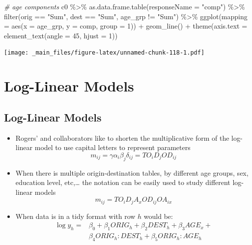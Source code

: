 \documentclass[
]{book}
\newenvironment{Shaded}{\begin{snugshade}}{\end{snugshade}}
\newcommand{\AttributeTok}[1]{\textcolor[rgb]{0.77,0.63,0.00}{#1}}
\newcommand{\CommentTok}[1]{\textcolor[rgb]{0.56,0.35,0.01}{\textit{#1}}}
\newcommand{\DecValTok}[1]{\textcolor[rgb]{0.00,0.00,0.81}{#1}}
\newcommand{\FunctionTok}[1]{\textcolor[rgb]{0.00,0.00,0.00}{#1}}
\newcommand{\NormalTok}[1]{#1}
\newcommand{\SpecialCharTok}[1]{\textcolor[rgb]{0.00,0.00,0.00}{#1}}
\newcommand{\StringTok}[1]{\textcolor[rgb]{0.31,0.60,0.02}{#1}}
\providecommand{\tightlist}{%
  \setlength{\itemsep}{0pt}\setlength{\parskip}{0pt}}
\begin{document}
\begin{Shaded}
\begin{Highlighting}[]
\CommentTok{\# age components}
\NormalTok{c0 }\SpecialCharTok{\%\textgreater{}\%}
  \FunctionTok{as.data.frame.table}\NormalTok{(}\AttributeTok{responseName =} \StringTok{"comp"}\NormalTok{) }\SpecialCharTok{\%\textgreater{}\%}
  \FunctionTok{filter}\NormalTok{(orig }\SpecialCharTok{==} \StringTok{"Sum"}\NormalTok{, dest }\SpecialCharTok{==} \StringTok{"Sum"}\NormalTok{, age\_grp }\SpecialCharTok{!=} \StringTok{"Sum"}\NormalTok{) }\SpecialCharTok{\%\textgreater{}\%}
  \FunctionTok{ggplot}\NormalTok{(}\AttributeTok{mapping =} \FunctionTok{aes}\NormalTok{(}\AttributeTok{x =}\NormalTok{ age\_grp, }\AttributeTok{y =}\NormalTok{ comp, }\AttributeTok{group =} \DecValTok{1}\NormalTok{)) }\SpecialCharTok{+}
  \FunctionTok{geom\_line}\NormalTok{() }\SpecialCharTok{+}
  \FunctionTok{theme}\NormalTok{(}\AttributeTok{axis.text =} \FunctionTok{element\_text}\NormalTok{(}\AttributeTok{angle =} \DecValTok{45}\NormalTok{, }\AttributeTok{hjust =} \DecValTok{1}\NormalTok{))}
\end{Highlighting}
\end{Shaded}

\texttt{[image: \_main\_files/figure-latex/unnamed-chunk-118-1.pdf]}

\hypertarget{log-linear-models}{%
\section{Log-Linear Models}\label{log-linear-models}}

\hypertarget{log-linear-models-1}{%
\subsection{Log-Linear Models}\label{log-linear-models-1}}

\begin{itemize}
\tightlist
\item
  Rogers' and collaborators like to shorten the multiplicative form of the log-linear model to use capital letters to represent parameters
  \[
  m_{ij} = \gamma \alpha_i \beta_j \delta_{ij} = T O_i D_j OD_{ij}
  \]
\item
  When there is multiple origin-destination tables, by different age groups, sex, education level, etc,\ldots{} the notation can be easily used to study different log-linear models
  \[
  m_{ij} = T O_i D_j A_x OD_{ij} OA_{ix}
  \]
\item
  When data is in a tidy format with row \(h\) would be:
  \[
  \begin{aligned}
  \log y_{h} =&  \beta_0 +  \beta_1 ORIG_{h} + \beta_2 DEST_{h} + \beta_3 AGE_{x} + \\
  &\beta_4 ORIG_{h}:DEST_{h} + \beta_5 ORIG_{h}:AGE_{h} 
  \end{aligned}
  \]
\end{itemize}
\end{document}
